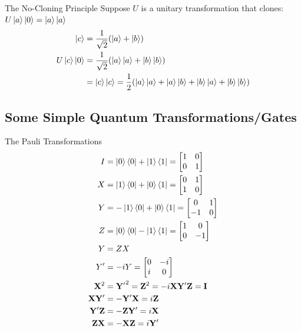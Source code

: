 \documentclass{beamer}
\begin{document}
\begin{frame}{The No-Cloning Principle}
  {\tiny
    Suppose $U$ is a unitary transformation that clones: $U\ket{a}\ket{0} = \ket{a}\ket{a}$
    \begin{align*}
      \ket{c} &= \frac{1}{\sqrt2} (\ket{a} + \ket{b}) \\
      U\ket{c}\ket{0} &=  \frac{1}{\sqrt2} ( \ket{a}\ket{a} + \ket{b}\ket{b} ) \\
                      &=  \ket{c}\ket{c} = \frac{1}{2} (  \ket{a}\ket{a} + \ket{a}\ket{b} + \ket{b}\ket{a} + \ket{b}\ket{b} )
    \end{align*}
  }%
\end{frame}

\subsection{Some Simple Quantum Transformations/Gates}

\begin{frame}{The Pauli Transformations}
  {\tiny
    \begin{align*}
      I &= \ket0\bra0 + \ket1\bra1 = \begin{bmatrix} 1 & 0 \\ 0 & 1 \end{bmatrix} \\
      X &= \ket1\bra0 + \ket0\bra1 = \begin{bmatrix} 0 & 1 \\ 1 & 0 \end{bmatrix} \\
      Y &= -\ket1\bra0 + \ket0\bra1 = \begin{bmatrix} 0 & 1 \\ -1 & 0 \end{bmatrix} \\
      Z &= \ket0\bra0 - \ket1\bra1 = \begin{bmatrix} 1 & 0 \\ 0 & -1 \end{bmatrix} \\
      Y &= ZX \\
      Y' &= -iY = \begin{bmatrix} 0 & -i \\ i & 0 \end{bmatrix} \\
      \mathbf{X}^2 &= \mathbf{Y'}^2 = \mathbf{Z}^2 = -i\mathbf{XY'Z} = \mathbf{I} \\
      \mathbf{XY'} &= -\mathbf{Y'X} = i\mathbf{Z} \\
      \mathbf{Y'Z} &= -\mathbf{ZY'} = i\mathbf{X} \\
      \mathbf{ZX} &= -\mathbf{XZ} = i\mathbf{Y'}
    \end{align*}
  }%
\end{frame}
\end{document}
